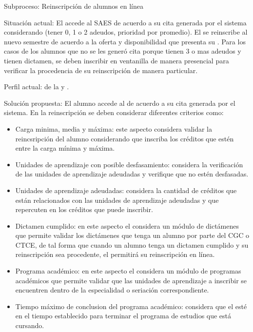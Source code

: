 \begin{Cdescription}
	\item[Subproceso:] Reinscripción de alumnos en línea
	\item[Situación actual:] El  accede al SAES de acuerdo a su cita generada por el sistema considerando (tener 0, 1 o 2 adeudos, prioridad por promedio). El  se reinscribe al nuevo semestre de acuerdo a la oferta y disponibilidad que presenta su . Para los casos de los alumnos que no se les generó cita porque tienen 3 o mas adeudos y tienen dictamen, se deben inscribir en ventanilla de manera presencial para verificar la procedencia de su reinscripción de manera particular. 

	\item[Perfil actual:]  de la  y .
	\item[Solución propuesta:] El alumno accede al  de acuerdo a su cita generada por el sistema. En la reinscripción se deben considerar diferentes criterios como:
	
	\begin{itemize}
		\item Carga minima, media y máxima: este aspecto considera validar la reincsripción del alumno considerando que inscriba los créditos que estén entre la carga mínima y máxima.
		\item Unidades de aprendizaje con posible desfasamiento: considera la verificación de las unidades de aprendizaje adeudadas y verifique que no estén desfasadas. 
		\item Unidades de aprendizaje adeudadas: considera la cantidad de créditos que están relacionados con las unidades de aprendizaje adeudadas y que repercuten en los créditos que puede inscribir.
		\item Dictamen cumplido: en este aspecto el  considera un módulo de dictámenes que permite validar los dictámenes que tenga un alumno por parte del CGC o CTCE, de tal forma que cuando un alumno tenga un dictamen cumplido y su reinscripción sea procedente, el  permitirá su reinscripción en línea.
		\item Programa académico: en este aspecto el  considera un módulo de programas académicos que permite validar que las unidades de aprendizaje a inscribir se encuentren dentro de la especialidad o seriación correspondiente.
		\item Tiempo máximo de conclusion del programa académico: considera que el  esté en el tiempo establecido para terminar el programa de estudios que está cursando.
	\end{itemize}	
		

\end{Cdescription}
